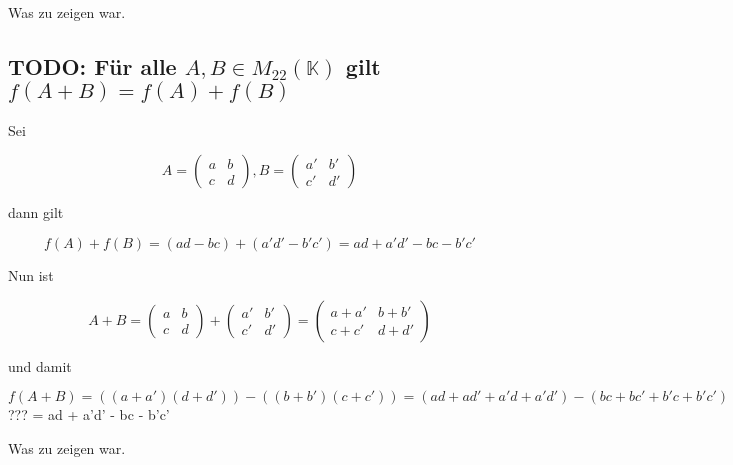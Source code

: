 \documentclass{article}
\begin{document}
Was zu zeigen war.

\subsection*{TODO: Für alle \(A, B\in M_{22}(\mathbb{K})\) gilt \(f(A+B) = f(A) + f(B)\)}

Sei

\[
A=
  \begin{pmatrix}
    a & b \\
    c & d
  \end{pmatrix}
,
B=
  \begin{pmatrix}
    a' & b' \\
    c' & d'
  \end{pmatrix}
\]

dann gilt

\[
f(A)+f(B) = (ad - bc) + (a'd' - b'c')
          = ad + a'd' - bc - b'c'
\]

Nun ist

\[
A+B=
  \begin{pmatrix}
    a & b \\
    c & d
  \end{pmatrix}
  +
  \begin{pmatrix}
    a' & b' \\
    c' & d'
  \end{pmatrix}
  =
  \begin{pmatrix}
    a+a' & b+b' \\
    c+c' & d+d'
  \end{pmatrix}
\]

und damit

\[
f(A+B)= ((a+a')(d+d'))-((b+b')(c+c'))
      = (ad+ad'+a'd+a'd')-(bc+bc'+b'c+b'c')
\]
???      = ad + a'd' - bc - b'c'

Was zu zeigen war.
\end{document}
